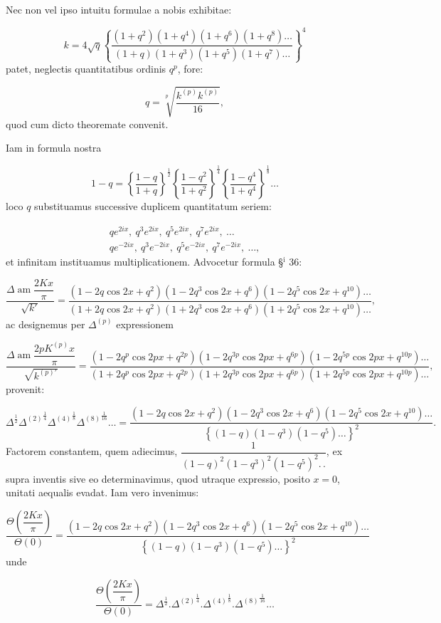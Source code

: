 \documentclass{article}
\begin{document}
Nec non vel ipso intuitu formulae a nobis exhibitae:

\[
k=4\sqrt{q}\left\{\frac{(1+q^{2})(1+q^{4})(1+q^{6})(1+q^{8})\ldots}{(1+q)(1+q^{3})(1+q^{5})(1+q^{7})\ldots}\right\}^{4}
\]
patet, neglectis quantitatibus ordinis $q^{p}$, fore:

\[
q=\sqrt[p]{\frac{k^{(p)}k^{(p)}}{16}},
\]
quod cum dicto theoremate convenit.

Iam in formula nostra

\[
1-q=\left\{\frac{1-q}{1+q}\right\}^{\frac{1}{2}}\left\{\frac{1-q^{2}}{1+q^{2}}\right\}^{\frac{1}{4}}\left\{\frac{1-q^{4}}{1+q^{4}}\right\}^{\frac{1}{8}}\ldots
\]
loco $q$ substituamus successive duplicem quantitatum seriem:

\[
\begin{gathered}
qe^{2ix},\ q^{3}e^{2ix},\ q^{5}e^{2ix},\ q^{7}e^{2ix},\ \ldots\\[1ex]
qe^{-2ix},\ q^{3}e^{-2ix},\ q^{5}e^{-2ix},\ q^{7}e^{-2ix},\ \ldots,
\end{gathered}
\]
et infinitam instituamus multiplicationem. Advocetur formula §$^{\mathrm{i}}$ 36:

\[
\frac{\Delta\operatorname{am}\dfrac{2Kx}{\pi}}{\sqrt{k'}}=\frac{(1-2q\cos2x+q^{2})(1-2q^{3}\cos2x+q^{6})(1-2q^{5}\cos2x+q^{10})\ldots}{(1+2q\cos2x+q^{2})(1+2q^{3}\cos2x+q^{6})(1+2q^{5}\cos2x+q^{10})\ldots},
\]
ac designemus per $\Delta^{(p)}$ expressionem

\[
\frac{\Delta\operatorname{am}\dfrac{2pK^{(p)}x}{\pi}}{\sqrt{k^{(p)\prime}}}=\frac{(1-2q^{p}\cos2px+q^{2p})(1-2q^{3p}\cos2px+q^{6p})(1-2q^{5p}\cos2px+q^{10p})\ldots}{(1+2q^{p}\cos2px+q^{2p})(1+2q^{3p}\cos2px+q^{6p})(1+2q^{5p}\cos2px+q^{10p})\ldots},
\]
provenit:

\[
\Delta^{\frac{1}{2}}{\Delta^{(2)}}^{\frac{1}{4}}{\Delta^{(4)}}^{\frac{1}{8}}{\Delta^{(8)}}^{\frac{1}{16}}\ldots=\frac{(1-2q\cos2x+q^{2})(1-2q^{3}\cos2x+q^{6})(1-2q^{5}\cos2x+q^{10})\ldots}{\left\{(1-q)(1-q^{3})(1-q^{5})\ldots\right\}^{2}}.
\]
Factorem constantem, quem adiecimus, $\dfrac{1}{(1-q)^{2}(1-q^{3})^{2}(1-q^{5})^{2}.\,.}$, ex supra inventis sive eo determinavimus, quod utraque expressio, posito $x=0$, unitati aequalis evadat. Iam vero invenimus:

\[
\frac{\Theta\left(\dfrac{2Kx}{\pi}\right)}{\Theta(0)}=\frac{(1-2q\cos2x+q^{2})(1-2q^{3}\cos2x+q^{6})(1-2q^{5}\cos2x+q^{10})\ldots}{\left\{(1-q)(1-q^{3})(1-q^{5})\ldots\right\}^{2}}
\]
unde

\[
\frac{\Theta\left(\dfrac{2Kx}{\pi}\right)}{\Theta(0)}=\Delta^{\frac{1}{2}}.{\Delta^{(2)}}^{\frac{1}{4}}.{\Delta^{(4)}}^{\frac{1}{8}}.{\Delta^{(8)}}^{\frac{1}{16}}\ldots
\]
\end{document}
